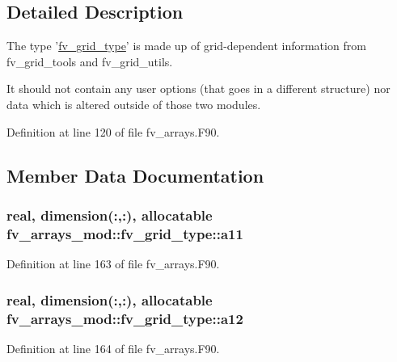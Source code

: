\subsection{Detailed Description}
The type '\hyperlink{structfv__arrays__mod_1_1fv__grid__type}{fv\-\_\-grid\-\_\-type}' is made up of grid-\/dependent information from fv\-\_\-grid\-\_\-tools and fv\-\_\-grid\-\_\-utils. 

It should not contain any user options (that goes in a different structure) nor data which is altered outside of those two modules. 

Definition at line 120 of file fv\-\_\-arrays.\-F90.



\subsection{Member Data Documentation}
\subsubsection[{a11}]{\setlength{\rightskip}{0pt plus 5cm}real, dimension(\-:,\-:), allocatable fv\-\_\-arrays\-\_\-mod\-::fv\-\_\-grid\-\_\-type\-::a11}\label{structfv__arrays__mod_1_1fv__grid__type_a031ca03cf75ef158170a02c92e33b712}


Definition at line 163 of file fv\-\_\-arrays.\-F90.

\subsubsection[{a12}]{\setlength{\rightskip}{0pt plus 5cm}real, dimension(\-:,\-:), allocatable fv\-\_\-arrays\-\_\-mod\-::fv\-\_\-grid\-\_\-type\-::a12}\label{structfv__arrays__mod_1_1fv__grid__type_aff9b4a668b6765383d5750a0244f1f29}


Definition at line 164 of file fv\-\_\-arrays.\-F90.

